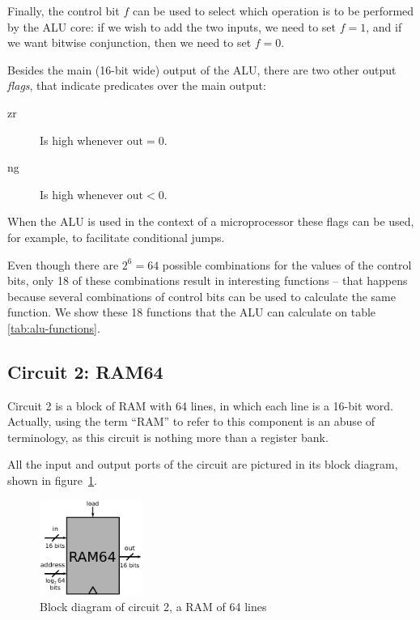        Finally, the control bit $f$ can be used to select which operation is to be performed by the
        ALU core: if we wish to add the two inputs, we need to set $f = 1$, and if we want bitwise
        conjunction, then we need to set $f = 0$.

        Besides the main (16-bit wide) output of the ALU, there are two other output \emph{flags},
        that indicate predicates over the main output:

        \begin{description}
            \item[zr] Is high whenever $\text{out} = 0$.
            \item[ng] Is high whenever $\text{out} < 0$.
        \end{description}

        When the ALU is used in the context of a microprocessor these flags can be used, for
        example, to facilitate conditional jumps.

        Even though there are $2^{6} = 64$ possible combinations for the values of the control bits,
        only 18 of these combinations result in interesting functions -- that happens because
        several combinations of control bits can be used to calculate the same function. We show
        these 18 functions that the ALU can calculate on table \ref{tab:alu-functions}.

        


    \subsection{Circuit 2: RAM64}
    \label{subsec:ram-circuit}

        Circuit 2 is a block of RAM with 64 lines, in which each line is a 16-bit word.  Actually,
        using the term ``RAM'' to refer to this component is an abuse of terminology, as this
        circuit is nothing more than a register bank.

        All the input and output ports of the circuit are pictured in its block diagram, shown
        in figure~\ref{fig:ram-block}.

        \begin{figure}[h!]
            \centerline{\includegraphics[width=0.3\textwidth]{imgs/ram-block.pdf}}
            \caption{Block diagram of circuit 2, a RAM of 64 lines
                \label{fig:ram-block}}
        \end{figure}

